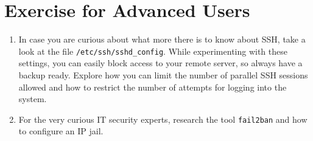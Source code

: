 \documentclass{dcbl/challenge}
\begin{document}
\section*{Exercise for Advanced Users}
\begin{enumerate}
    \item In case you are curious about what more there is to know about SSH, take a look at the file \texttt{/etc/ssh/sshd\_config}. While experimenting with these settings, you can easily block access to your remote server, so always have a backup ready. Explore how you can limit the number of parallel SSH sessions allowed and how to restrict the number of attempts for logging into the system.

    \item For the very curious IT security experts, research the tool \texttt{fail2ban} and how to configure an IP jail.
\end{enumerate}
\end{document}
